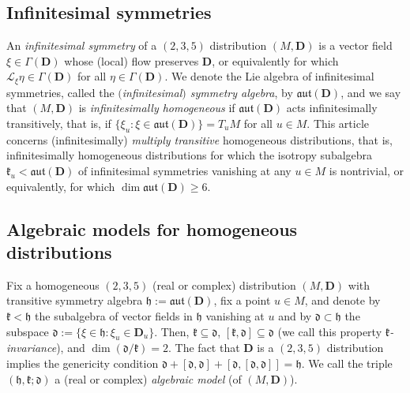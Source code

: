 \documentclass[pdftex]{sigma}
\newcommand{\mbD}{\mathbf{D}}
\newcommand{\mcL}{\mathcal{L}}
\newcommand{\mfd} {\mathfrak{d}}
\newcommand{\mfh} {\mathfrak{h}}
\newcommand{\mfk} {\mathfrak{k}}
\newcommand{\mfaut}{\mathfrak{aut}}
\numberwithin{equation}{section}
\begin{document}
\subsection{Infinitesimal symmetries} An \textit{infinitesimal symmetry} of a $(2, 3, 5)$ distribution $(M, \mbD)$ is a vector field $\xi \in \Gamma(\mbD)$ 	whose (local) flow preserves $\mbD$, or equivalently for which $\mcL_{\xi} \eta \in \Gamma(\mbD)$ for all $\eta \in \Gamma(\mbD)$. We denote the Lie algebra of infinitesimal symmetries, called the \textit{$($infinitesimal$)$ symmetry algebra}, by $\mfaut(\mbD)$, and we say that $(M, \mbD)$ is \textit{infinitesimally homogeneous} if $\mfaut(\mbD)$ acts infinitesimally transitively, that is, if $\{\xi_u \colon \xi \in \mfaut(\mbD)\} = T_u M$ for all $u \in M$. This article concerns (infinitesimally) \textit{multiply transitive} homogeneous distributions, that is, infinitesimally homogeneous distributions for which the isotropy subalgebra $\mfk_u < \mfaut(\mbD)$ of infinitesimal symmetries vanishing at any $u \in M$ is nontrivial, or equivalently, for which $\dim \mfaut(\mbD) \geq 6$.

\subsection{Algebraic models for homogeneous distributions}

Fix a homogeneous $(2, 3, 5)$ (real or complex) distribution $(M, \mbD)$ with transitive symmetry algebra $\mfh := \mfaut(\mbD)$, fix a point $u \in M$, and denote by $\mfk < \mfh$ the subalgebra of vector fields in $\mfh$ vanishing at $u$ and by $\mfd \subset \mfh$ the subspace $\mfd := \{\xi \in \mfh \colon \xi_u \in \mbD_u\}$. Then, $\mfk \subseteq \mfd$, $[\mfk, \mfd] \subseteq \mfd$ (we call this property \textit{$\mfk$-invariance}), and $\dim(\mfd / \mfk) = 2$. The fact that $\mbD$ is a $(2, 3, 5)$ distribution implies the genericity condition $\mfd + [\mfd, \mfd] + [\mfd, [\mfd, \mfd]] = \mfh$. We call the triple $(\mfh, \mfk; \mfd)$ a (real or complex) \textit{algebraic model} (of $(M, \mbD)$).
\end{document}
